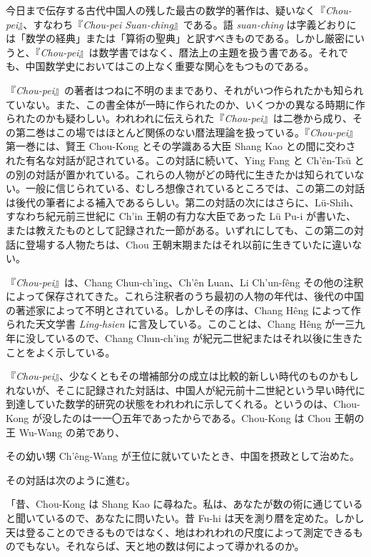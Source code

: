 \documentclass[11pt]{article}
\newcommand{\scanpage}[2]{\clearpage\setcounter{footnote}{0}\noindent{\footnotesize\color{gray}PDF #1 頁 · #2}\par\medskip}
\newcommand{\scanfooter}{}
\begin{document}
今日まで伝存する古代中国人の残した最古の数学的著作は、疑いなく『\emph{Chou-pei}』、すなわち『\emph{Chou-pei Suan-ching}』である。語 \emph{suan-ching} は字義どおりには「数学の経典」または「算術の聖典」と訳すべきものである。しかし厳密にいうと、『\emph{Chou-pei}』は数学書ではなく、暦法上の主題を扱う書である。それでも、中国数学史においてはこの上なく重要な関心をもつものである。

『\emph{Chou-pei}』の著者はつねに不明のままであり、それがいつ作られたかも知られていない。また、この書全体が一時に作られたのか、いくつかの異なる時期に作られたのかも疑わしい。われわれに伝えられた『\emph{Chou-pei}』は二巻から成り、その第二巻はこの場ではほとんど関係のない暦法理論を扱っている。『\emph{Chou-pei}』第一巻には、賢王 Chou-Kong とその学識ある大臣 Shang Kao との間に交わされた有名な対話が記されている。この対話に続いて、Ying Fang と Ch'ên-Tsŭ との別の対話が置かれている。これらの人物がどの時代に生きたかは知られていない。一般に信じられている、むしろ想像されているところでは、この第二の対話は後代の筆者による補入であるらしい。第二の対話の次にはさらに、Lü-Shih、すなわち紀元前三世紀に Ch'in 王朝の有力な大臣であった Lü Pu-i が書いた、または教えたものとして記録された一節がある。いずれにしても、この第二の対話に登場する人物たちは、Chou 王朝末期またはそれ以前に生きていたに違いない。

『\emph{Chou-pei}』は、Chang Chun-ch'ing、Ch'ên Luan、Li Ch'un-fêng その他の注釈によって保存されてきた。これら注釈者のうち最初の人物の年代は、後代の中国の著述家によって不明とされている。しかしその序は、Chang Hêng によって作られた天文学書 \emph{Ling-hsien} に言及している。このことは、Chang Hêng が一三九年に没しているので、Chang Chun-ch'ing が紀元二世紀またはそれ以後に生きたことをよく示している。

『\emph{Chou-pei}』、少なくともその増補部分の成立は比較的新しい時代のものかもしれないが、そこに記録された対話は、中国人が紀元前十二世紀という早い時代に到達していた数学的研究の状態をわれわれに示してくれる。というのは、Chou-Kong が没したのは一一〇五年であったからである。Chou-Kong は Chou 王朝の王 Wu-Wang の弟であり、
\scanfooter

\scanpage{0019}{第二章、印刷頁5}
その幼い甥 Ch'êng-Wang が王位に就いていたとき、中国を摂政として治めた。

その対話は次のように進む。

「昔、Chou-Kong は Shang Kao に尋ねた。私は、あなたが数の術に通じていると聞いているので、あなたに問いたい。昔 Fu-hi は天を測り暦を定めた。しかし天は登ることのできるものではなく、地はわれわれの尺度によって測定できるものでもない。それならば、天と地の数は何によって導かれるのか。
\end{document}
